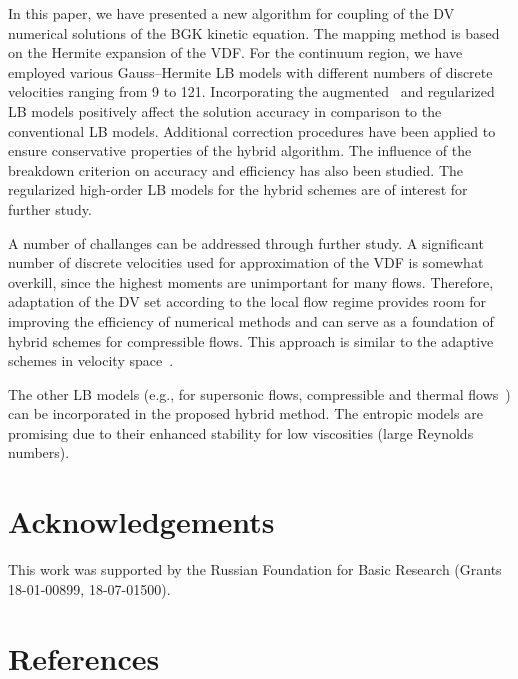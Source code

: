 \documentclass[]{elsarticle} %
\begin{document}
In this paper, we have presented a new algorithm for coupling of the DV numerical solutions of the BGK kinetic equation.
The mapping method is based on the Hermite expansion of the VDF.
For the continuum region, we have employed various Gauss--Hermite LB models with different numbers of discrete velocities ranging from 9 to 121.
Incorporating the augmented~\cite{Feuchter2016} and regularized~\cite{Latt2006, Mont2015} LB models
positively affect the solution accuracy in comparison to the conventional LB models.
Additional correction procedures have been applied to ensure conservative properties of the hybrid algorithm.
The influence of the breakdown criterion on accuracy and efficiency has also been studied.
The regularized high-order LB models for the hybrid schemes are of interest for further study.

A number of challanges can be addressed through further study.
A significant number of discrete velocities used for approximation of the VDF is somewhat overkill,
since the highest moments are unimportant for many flows.
Therefore, adaptation of the DV set according to the local flow regime provides room for improving the efficiency of numerical methods
and can serve as a foundation of hybrid schemes for compressible flows.
This approach is similar to the adaptive schemes in velocity space~\cite{Aristov1977, Kolobov2013, Baranger2014}.

The other LB models (e.g., for supersonic flows, compressible and thermal flows~\cite{Chen2010, Frapolli2015, Frapolli2016})
can be incorporated in the proposed hybrid method.
The entropic models are promising due to their enhanced stability for low viscosities (large Reynolds numbers).

\section*{Acknowledgements}

This work was supported by the Russian Foundation for Basic Research (Grants 18-01-00899, 18-07-01500).

\section*{References}


\end{document}
